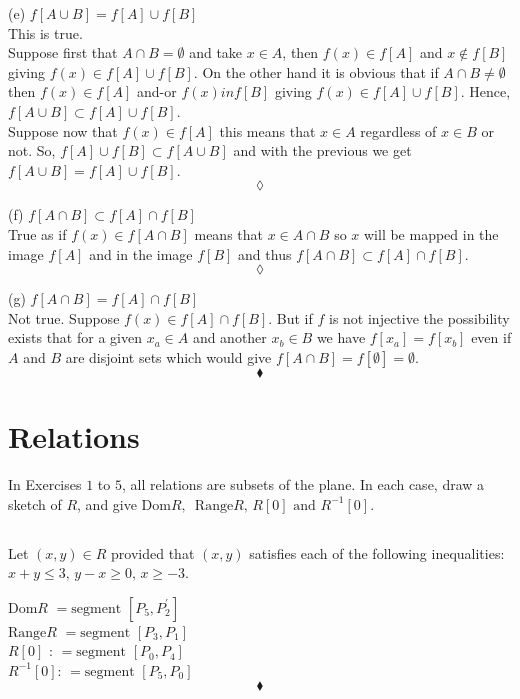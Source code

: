 (e)  $f[A\cup B]= f[A]\cup f[B]$ \\
This is  true. \\
Suppose first that $A\cap B=\emptyset$ and take $x\in A$, then $f(x) \in f[A]$ and $x\not \in f[B]$ giving $f(x)\in f[A]\cup f[B]$. On the other hand it is obvious that if $A\cap B\ne\emptyset$ then $f(x) \in f[A]$ and-or $f(x) in f[B]$ giving $f(x) \in f[A]\cup f[B]$. Hence, $f[A\cup B]\subset f[A]\cup f[B]$.\\
Suppose now that $f(x) \in f[A]$ this means that $x\in A$ regardless of $x\in B$ or not. So, $f[A]\cup f[B]\subset f[A\cup B]$ and with the previous we get $f[A\cup B]= f[A]\cup f[B]$.
$$\lozenge$$

(f)  $f[A\cap B]\subset f[A]\cap f[B]$ \\
True as if $f(x) \in f[A\cap B]$ means that $x\in A\cap B$ so $x $ will be mapped in the image $f[A]$ and in the image $f[B]$ and thus $f[A\cap B]\subset f[A]\cap f[B]$.
$$\lozenge$$

(g)  $f[A\cap B] = f[A]\cap f[B]$ \\
Not true.
Suppose $f(x) \in f[A]\cap f[B]$. But if $f$ is not injective the possibility exists that for a given $x_a\in A$ and another $x_b \in B$ we have $f[x_a]= f[x_b]$ even if $A$ and $B$ are disjoint sets which would give $f[A\cap B]=f[\emptyset]=\emptyset$.
$$\blacklozenge$$
\newpage


 \section{Relations}
 In Exercises $1$ to $5$, all relations are subsets of the plane. In each case, draw a sketch of $R$, and give $\text{Dom}R,\, \text{ Range} R,\, R[0] \text{ and  } R^{-1}[0]$.
\subsection{}
\begin{tcolorbox}
 Let $(x,y)\in R$ provided that $(x,y)$ satisfies each of the following inequalities: $x+y\le 3,\,y-x \ge 0,\, x \ge -3$.
\end{tcolorbox}
\begin{figure}[H]%
    \centering
    \subfloat[$x+y\le 3,\,y-x \ge 0,\, x \ge -3$]{}
\label{fig:fig_p8b}
\end{figure}
$$ $$
\textbf{$\text{Dom}R$} $=\text{segment }[P_5,P_2^{'}]$\\
\textbf{$\text{Range} R$} $=\text{segment }[P_3,P_1]$\\
\textbf{$R[0]$ }: $=\text{segment }[P_0,P_4]$\\
\textbf{$R^{-1}[0]$}: $=\text{segment }[P_5,P_0]$
$$\blacklozenge$$

